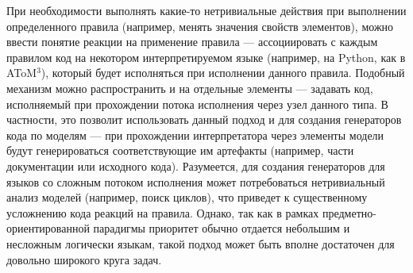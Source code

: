 \documentclass[a5paper]{article}
\begin{document}
При необходимости выполнять какие-то нетривиальные действия при выполнении определенного правила (например, менять значения свойств элементов), можно ввести понятие реакции на применение правила --- ассоциировать с каждым правилом код на некотором интерпретируемом языке (например, на Python, как в AToM$^3$), который будет исполняться при исполнении данного правила. Подобный механизм можно распространить и на отдельные элементы --- задавать код, исполняемый при прохождении потока исполнения через узел данного типа. В частности, это позволит использовать данный подход и для создания генераторов кода по моделям --- при прохождении интерпретатора через элементы модели будут генерироваться соответствующие им артефакты (например, части документации или исходного кода). Разумеется, для создания генераторов для языков со сложным потоком исполнения может потребоваться нетривиальный анализ моделей (например, поиск циклов), что приведет к существенному усложнению кода реакций на правила. Однако, так как в рамках предметно-ориентированной парадигмы приоритет обычно отдается небольшим и несложным логически языкам, такой подход может быть вполне достаточен для довольно широкого круга задач.
\end{document}
